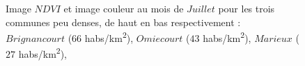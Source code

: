 \documentclass{book}
\begin{document}
\begin{figure}[H]
{}
\caption{Image $NDVI$ et image couleur au mois de $Juillet$ pour les trois communes peu denses, de haut en bas respectivement :
$Brignancourt$ ($66$ habs/km\textsuperscript{2}),
$Omiecourt$ ($43$ habs/km\textsuperscript{2}),
$Marieux$ ($27$ habs/km\textsuperscript{2}),
}
\label{ndvi_cat4}
\end{figure}
\clearpage


\clearpage
\backmatter

\listoftables

\listoffigures



\end{document}
